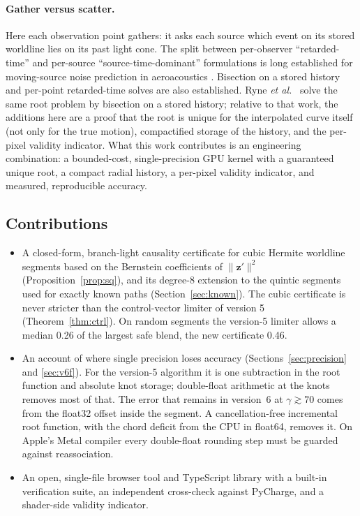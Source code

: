 \documentclass[11pt, a4paper]{article}
\begin{document}
\paragraph{Gather versus scatter.} Here each observation point gathers: it asks each source which event on its stored worldline lies on its past light cone. The split between per-observer ``retarded-time'' and per-source ``source-time-dominant'' formulations is long established for moving-source noise prediction in aeroacoustics \cite{brentner1996, brentner1997}. Bisection on a stored history \cite{ryne2013, zhao2026} and per-point retarded-time solves \cite{pycharge2022} are also established. Ryne \textit{et al.}\ \cite{ryne2013} solve the same root problem by bisection on a stored history; relative to that work, the additions here are a proof that the root is unique for the interpolated curve itself (not only for the true motion), compactified storage of the history, and the per-pixel validity indicator. What this work contributes is an engineering combination: a bounded-cost, single-precision GPU kernel with a guaranteed unique root, a compact radial history, a per-pixel validity indicator, and measured, reproducible accuracy.

\subsection*{Contributions}
\begin{itemize}
    \item A closed-form, branch-light causality certificate for cubic Hermite worldline segments based on the Bernstein coefficients of $\|\mathbf{z}'\|^2$ (Proposition~\ref{prop:sq}), and its degree-8 extension to the quintic segments used for exactly known paths (Section~\ref{sec:known}). The cubic certificate is never stricter than the control-vector limiter of version 5 (Theorem~\ref{thm:ctrl}). On random segments the version-5 limiter allows a median 0.26 of the largest safe blend, the new certificate 0.46.
    \item An account of where single precision loses accuracy (Sections~\ref{sec:precision} and \ref{sec:v6f}). For the version-5 algorithm it is one subtraction in the root function and absolute knot storage; double-float arithmetic at the knots removes most of that. The error that remains in version~6 at $\gamma \gtrsim 70$ comes from the float32 offset inside the segment. A cancellation-free incremental root function, with the chord deficit from the CPU in float64, removes it. On Apple's Metal compiler every double-float rounding step must be guarded against reassociation.
    \item An open, single-file browser tool and TypeScript library with a built-in verification suite, an independent cross-check against PyCharge, and a shader-side validity indicator.
\end{itemize}
\end{document}
